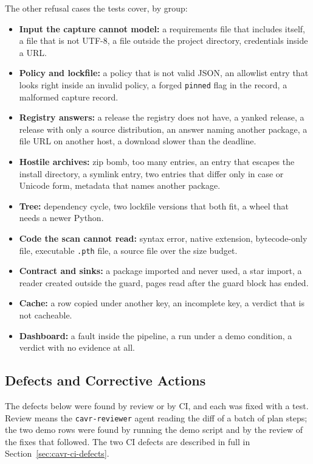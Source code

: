 The other refusal cases the tests cover, by group:
\begin{itemize}
    \item \textbf{Input the capture cannot model:} a requirements file that includes itself, a file that is not UTF-8, a file outside the project directory, credentials inside a URL.
    \item \textbf{Policy and lockfile:} a policy that is not valid JSON, an allowlist entry that looks right inside an invalid policy, a forged \texttt{pinned} flag in the record, a malformed capture record.
    \item \textbf{Registry answers:} a release the registry does not have, a yanked release, a release with only a source distribution, an answer naming another package, a file URL on another host, a download slower than the deadline.
    \item \textbf{Hostile archives:} zip bomb, too many entries, an entry that escapes the install directory, a symlink entry, two entries that differ only in case or Unicode form, metadata that names another package.
    \item \textbf{Tree:} dependency cycle, two lockfile versions that both fit, a wheel that needs a newer Python.
    \item \textbf{Code the scan cannot read:} syntax error, native extension, bytecode-only file, executable \texttt{.pth} file, a source file over the size budget.
    \item \textbf{Contract and sinks:} a package imported and never used, a star import, a reader created outside the guard, pages read after the guard block has ended.
    \item \textbf{Cache:} a row copied under another key, an incomplete key, a verdict that is not cacheable.
    \item \textbf{Dashboard:} a fault inside the pipeline, a run under a demo condition, a verdict with no evidence at all.
\end{itemize}

\subsection{Defects and Corrective Actions}
The defects below were found by review or by CI, and each was fixed with a test. Review means the \texttt{cavr-reviewer} agent reading the diff of a batch of plan steps; the two demo rows were found by running the demo script and by the review of the fixes that followed. The two CI defects are described in full in Section~\ref{sec:cavr-ci-defects}.

